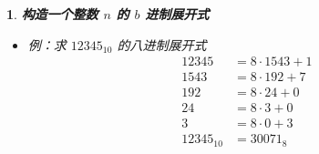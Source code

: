 \documentclass[UTF8]{report}
\theoremstyle{MyLineTheoremStyle} %
\theoremstyle{MyBlockTheoremStyle} %
\theoremstyle{MySubsubsectionStyle} %
\newtheorem{definition}{}
\begin{document}
\begin{definition}
    \textbf{构造一个整数 $n$ 的 $b$ 进制展开式}
    \begin{itemize}
        \item 例：求 $12345_{10}$ 的八进制展开式
        \begin{align*}
        12345 &= 8 \cdot 1543 + 1 \\
        1543 &= 8 \cdot 192 + 7 \\
        192 &= 8 \cdot 24 + 0 \\
        24 &= 8 \cdot 3 + 0 \\
        3 &= 8 \cdot 0 + 3 \\
        12345_{10} &= 30071_{8}
        \end{align*}
    \end{itemize}
\end{definition}
\end{document}
